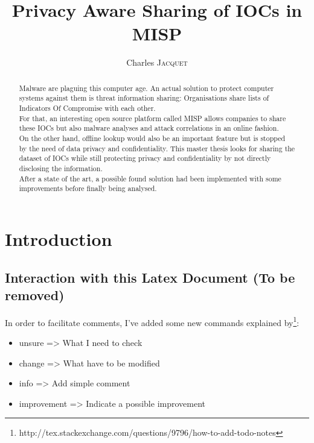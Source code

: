 \documentclass{eplmastersthesis}
\title{Privacy Aware Sharing of IOCs in MISP}	%
\author{Charles \textsc{Jacquet}}	%
\begin{document}
\maketitle					%
\thispagestyle{empty}		%


\begin{abstract} 
Malware are plaguing this computer age. An actual solution to protect computer systems against them is threat information sharing: Organisations share lists of Indicators Of Compromise with each other.\\
For that, an interesting open source platform called MISP allows companies to share these IOCs but also malware analyses and attack correlations in an online fashion.\\
On the other hand, offline lookup would also be an important feature but is stopped by the need of data privacy and confidentiality. This master thesis looks for sharing the dataset of IOCs while still protecting privacy and confidentiality by not directly disclosing the information. \\
After a state of the art, a possible found solution had been implemented with  some improvements before finally being analysed.
\end{abstract}

\tableofcontents

\chapter{Introduction}
\section{Interaction with this Latex Document (To be removed)}
In order to facilitate comments, I've added some new commands explained by\footnote{http://tex.stackexchange.com/questions/9796/how-to-add-todo-notes}:\\
\begin{itemize}
\item unsure => What I need to check
\item change => What have to be modified
\item info => Add simple comment
\item improvement => Indicate a possible improvement
\end{itemize}
\end{document}
